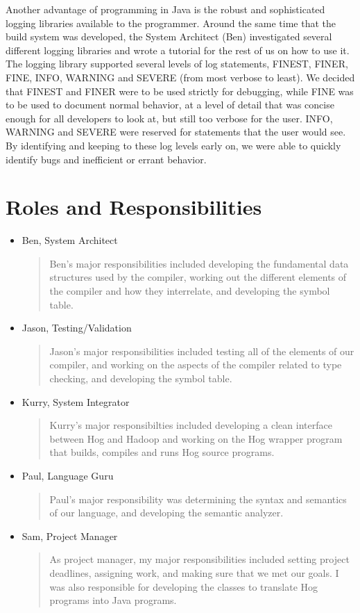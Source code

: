 \documentclass{report}
\begin{document}
Another advantage of programming in Java is the robust and sophisticated logging
libraries available to the programmer. Around the same time that the build system
was developed, the System Architect (Ben) investigated several different logging
libraries and wrote a tutorial for the rest of us on how to use it. The logging
library supported several levels of log statements, FINEST, FINER, FINE, INFO,
WARNING and SEVERE (from most verbose to least). We decided that FINEST and FINER
were to be used strictly for debugging, while FINE was to be used to document 
normal behavior, at a level of detail that was concise enough for all developers
to look at, but still too verbose for the user. INFO, WARNING and SEVERE were
reserved for statements that the user would see. By identifying and keeping
to these log levels early on, we were able to quickly identify bugs and 
inefficient or errant behavior. 

\section{Roles and Responsibilities}

\begin{itemize}
\item Ben, System Architect 
\begin{quotation}
\noindent Ben's major responsibilities included developing the fundamental data structures
used by the compiler, working out the different elements of the compiler and
how they interrelate, and developing the symbol table.   
\end{quotation}
\item Jason, Testing/Validation
\begin{quotation}
\noindent Jason's major responsibilities included testing all of the elements of our compiler,
and working on the aspects of the compiler related to type checking, and developing
the symbol table.
\end{quotation}
\item Kurry, System Integrator
\begin{quotation}
\noindent Kurry's major responsibilties included developing a clean interface between
Hog and Hadoop and working on the Hog wrapper program that builds, compiles and
runs Hog source programs.  
\end{quotation}
\item Paul, Language Guru
\begin{quotation}
\noindent Paul's major responsibility was determining the syntax and semantics of our
language, and developing the semantic analyzer.
\end{quotation}
\item Sam, Project Manager
\begin{quotation}
\noindent As project manager, my major responsibilities included setting project deadlines,
assigning work, and making sure that we met our goals. I was also responsible
for developing the classes to translate Hog programs into Java programs. 
\end{quotation}
\end{itemize}
\end{document}
